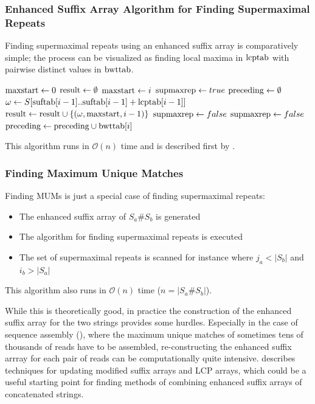 \documentclass[a4paper,10pt]{article}
\begin{document}
\subsubsection*{Enhanced Suffix Array Algorithm for Finding Supermaximal Repeats}

Finding supermaximal repeats using an enhanced suffix array is
comparatively simple; the process can be visualized as finding
local maxima in $\hbox{lcptab}$  with pairwise distinct values in
$\hbox{bwttab}$.

\begin{algorithmic}
\State $\hbox{maxstart} \gets 0$
\State $\hbox{result} \gets \emptyset$
		\State $\hbox{maxstart} \gets i$
		\State $\hbox{supmaxrep} \gets true$
		\State $\hbox{preceding} \gets \emptyset$
		\State $\omega \gets S[\hbox{suftab}[i-1]..\hbox{suftab}[i-1] +\hbox{lcptab}[i-1]]$
		\State $\hbox{result} \gets \hbox{result} \cup \{(\omega, \hbox{maxstart}, i-1)\}$
		\State $\hbox{supmaxrep} \gets false$
	\EndIf
		\State $\hbox{supmaxrep} \gets false$
	\Else
		\State $\hbox{preceding} \gets \hbox{preceding} \cup \hbox{bwttab}[i] $
	\EndIf
\EndFor
\end{algorithmic}

This algorithm runs in $\mathcal{O}(n)$ time and is described first by
\citealt{abouelhoda2002enhanced}.

\subsubsection*{Finding Maximum Unique Matches}

Finding MUMs is just a special case of finding supermaximal repeats:

\begin{itemize}
\item The enhanced suffix array of $S_a\#S_b$ is generated
\item The algorithm for finding supermaximal repeats is executed
\item The set of supermaximal repeats is scanned for instance where $j_a<|S_b|$ and $i_b>|S_a|$
\end{itemize}

This algorithm also runs in $\mathcal{O}(n)$ time ($n=|S_a\#S_b|$).

While this is theoretically good, in practice the construction
of the enhanced suffix array for the two strings provides
some hurdles. Especially in the case of sequence assembly
(\citealt{myers2000whole}), where the maximum unique matches of sometimes
tens of thousands of reads have to be assembled, re-constructing the
enhanced suffix arrray for each pair of reads can be computationally
quite intensive. \citealt{salson2010dynamic} describes techniques for
updating modified suffix arrays and LCP arrays, which could be a useful
starting point for finding methods of combining enhanced suffix arrays
of concatenated strings.
\end{document}
